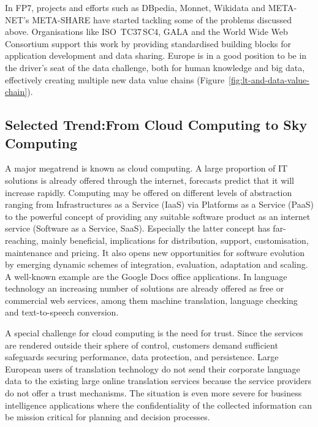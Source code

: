 \documentclass[10pt, plain]{../../metanetpaper}
\begin{document}
\begin{multicols}{2}
In FP7, projects and efforts such as DBpedia, Monnet, Wikidata and META-NET's META-SHARE have started tackling some of the problems discussed above. Organisations like ISO~TC37\,SC4, GALA and the World Wide Web Consortium  support this work by providing standardised building blocks for application development and data sharing. Europe is in a good position to be in the driver's seat of the data challenge, both for human knowledge and big data, effectively creating multiple new data value chains (Figure~\ref{fig:lt-and-data-value-chain}).

\subsection[Selected Trend: From Cloud Computing to Sky Computing]{Selected Trend:\newline From Cloud Computing to Sky Computing}
\label{sec:cloud-sky-computing}

A major megatrend is known as cloud computing. A large proportion of IT solutions is already offered through the internet, forecasts predict that it will increase rapidly. Computing may be offered on different levels of abstraction ranging from Infrastructures as a Service (IaaS) via Platforms as a Service (PaaS) to the powerful concept of providing any suitable software product as an internet service (Software as a Service, SaaS). Especially the latter concept has far-reaching, mainly beneficial, implications for distribution, support, customisation, maintenance and pricing. It also opens new opportunities for software evolution by emerging dynamic schemes of integration, evaluation, adaptation and scaling. A well-known example are the Google Docs office applications. In language technology an increasing number of solutions are already offered as free or commercial web services, among them machine translation, language checking and text-to-speech conversion.

A special challenge for cloud computing is the need for trust. Since the services are rendered outside their sphere of control, customers demand sufficient safeguards securing performance, data protection, and persistence. Large European users of translation technology do not send their corporate language data to the existing large online translation services because the service providers do not offer a trust mechanisms. The situation is even more severe for business intelligence applications where the confidentiality of the collected information can be mission critical for planning and decision processes.  


\end{multicols}
\end{document}
